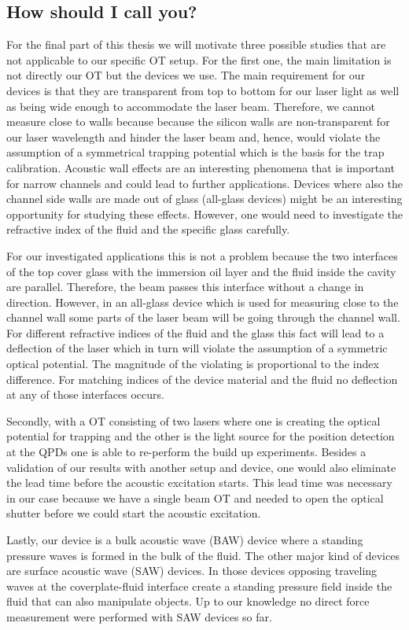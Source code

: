 \subsection{How should I call you?}

For the final part of this thesis we will motivate three possible studies that 
are not applicable to our specific OT setup. For the first one, the main 
limitation is not directly our OT but the devices we use. The main requirement 
for our devices is that they are transparent from top to bottom for our laser 
light as well as being wide enough to accommodate the laser beam. Therefore, we 
cannot measure close to walls because because the silicon walls are 
non-transparent for our laser wavelength and hinder the laser beam and, hence, 
would violate the assumption of a symmetrical trapping potential which is the 
basis for the trap calibration. Acoustic wall effects are an interesting 
phenomena that is important for narrow channels and could lead to further 
applications. Devices where also the channel side walls are made out of glass 
(all-glass devices) might be an interesting opportunity for studying these 
effects. However, one would need to investigate the refractive index of the 
fluid and the specific glass carefully.

For our investigated applications this is not a problem because the two 
interfaces of the top cover glass with the immersion oil layer and the fluid 
inside the cavity are parallel. Therefore, the beam passes this interface 
without a change in direction. However, in an all-glass device which is used 
for measuring close to the channel wall some parts of the laser beam will be 
going through the channel wall. For different refractive indices of the fluid 
and the glass this fact will lead to a deflection of the laser which in turn 
will violate the assumption of a symmetric optical potential. The magnitude of 
the violating is proportional to the index difference. For matching indices of 
the device material and the fluid no deflection at any of those interfaces 
occurs.

Secondly, with a OT consisting of two lasers where one is creating the optical 
potential for trapping and the other is the light source for the position 
detection at the QPDs one is able to re-perform the build up experiments.  
Besides a validation of our results with another setup and device, one would 
also eliminate the lead time before the acoustic excitation starts. This lead 
time was necessary in our case because we have a single beam OT and needed to 
open the optical shutter before we could start the acoustic excitation.

Lastly, our device is a bulk acoustic wave (BAW) device where a standing 
pressure waves is formed in the bulk of the fluid. The other major kind of 
devices are surface acoustic wave (SAW) devices. In those devices opposing 
traveling waves at the coverplate-fluid interface create a standing pressure 
field inside the fluid that can also manipulate objects. Up to our knowledge no 
direct force measurement were performed with SAW devices so far.
